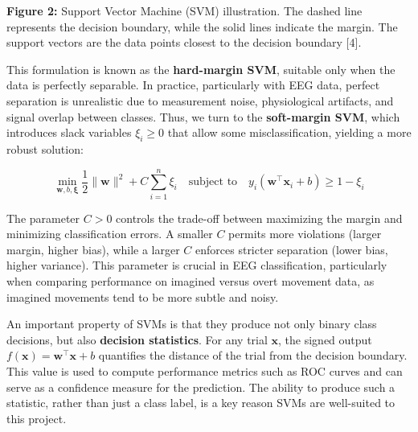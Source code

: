 \documentclass[
  letterpaper,
  DIV=11,
  numbers=noendperiod]{scrartcl}
\begin{document}
\begin{figure}


\caption{\label{fig-svm}}

\end{figure}%

\textbf{Figure 2:} Support Vector Machine (SVM) illustration. The dashed
line represents the decision boundary, while the solid lines indicate
the margin. The support vectors are the data points closest to the
decision boundary {[}4{]}.

This formulation is known as the \textbf{hard-margin SVM}, suitable only
when the data is perfectly separable. In practice, particularly with EEG
data, perfect separation is unrealistic due to measurement noise,
physiological artifacts, and signal overlap between classes. Thus, we
turn to the \textbf{soft-margin SVM}, which introduces slack variables
\(\xi_i \geq 0\) that allow some misclassification, yielding a more
robust solution:

\[
\min_{\mathbf{w}, b, \boldsymbol{\xi}} \frac{1}{2} \|\mathbf{w}\|^2 + C \sum_{i=1}^{n} \xi_i
\quad \text{subject to} \quad
y_i (\mathbf{w}^\top \mathbf{x}_i + b) \geq 1 - \xi_i
\]

The parameter \(C > 0\) controls the trade-off between maximizing the
margin and minimizing classification errors. A smaller \(C\) permits
more violations (larger margin, higher bias), while a larger \(C\)
enforces stricter separation (lower bias, higher variance). This
parameter is crucial in EEG classification, particularly when comparing
performance on imagined versus overt movement data, as imagined
movements tend to be more subtle and noisy.

An important property of SVMs is that they produce not only binary class
decisions, but also \textbf{decision statistics}. For any trial
\(\mathbf{x}\), the signed output
\(f(\mathbf{x}) = \mathbf{w}^\top \mathbf{x} + b\) quantifies the
distance of the trial from the decision boundary. This value is used to
compute performance metrics such as ROC curves and can serve as a
confidence measure for the prediction. The ability to produce such a
statistic, rather than just a class label, is a key reason SVMs are
well-suited to this project.
\end{document}
